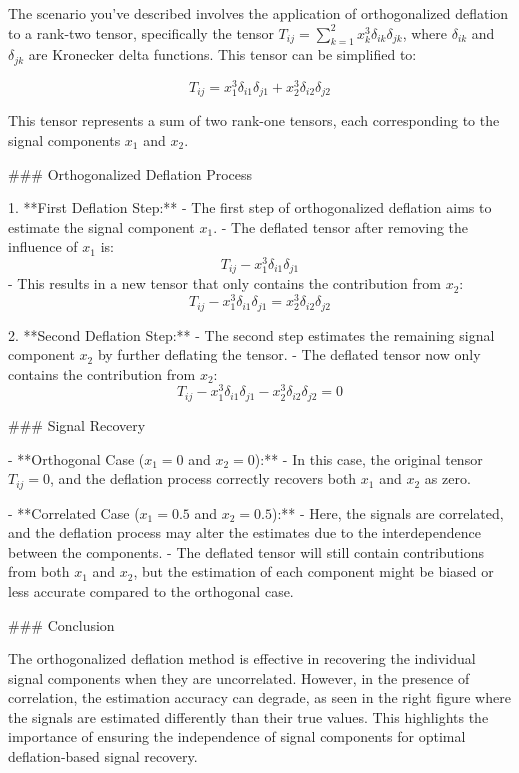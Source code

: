 The scenario you've described involves the application of orthogonalized deflation to a rank-two tensor, specifically the tensor \( T_{ij} = \sum_{k=1}^{2} x_k^3 \delta_{ik} \delta_{jk} \), where \( \delta_{ik} \) and \( \delta_{jk} \) are Kronecker delta functions. This tensor can be simplified to:

\[ T_{ij} = x_1^3 \delta_{i1} \delta_{j1} + x_2^3 \delta_{i2} \delta_{j2} \]

This tensor represents a sum of two rank-one tensors, each corresponding to the signal components \( x_1 \) and \( x_2 \).

### Orthogonalized Deflation Process

1. **First Deflation Step:**
   - The first step of orthogonalized deflation aims to estimate the signal component \( x_1 \).
   - The deflated tensor after removing the influence of \( x_1 \) is:
     \[ T_{ij} - x_1^3 \delta_{i1} \delta_{j1} \]
   - This results in a new tensor that only contains the contribution from \( x_2 \):
     \[ T_{ij} - x_1^3 \delta_{i1} \delta_{j1} = x_2^3 \delta_{i2} \delta_{j2} \]

2. **Second Deflation Step:**
   - The second step estimates the remaining signal component \( x_2 \) by further deflating the tensor.
   - The deflated tensor now only contains the contribution from \( x_2 \):
     \[ T_{ij} - x_1^3 \delta_{i1} \delta_{j1} - x_2^3 \delta_{i2} \delta_{j2} = 0 \]

### Signal Recovery

- **Orthogonal Case (\( x_1 = 0 \) and \( x_2 = 0 \)):**
  - In this case, the original tensor \( T_{ij} = 0 \), and the deflation process correctly recovers both \( x_1 \) and \( x_2 \) as zero.

- **Correlated Case (\( x_1 = 0.5 \) and \( x_2 = 0.5 \)):**
  - Here, the signals are correlated, and the deflation process may alter the estimates due to the interdependence between the components.
  - The deflated tensor will still contain contributions from both \( x_1 \) and \( x_2 \), but the estimation of each component might be biased or less accurate compared to the orthogonal case.

### Conclusion

The orthogonalized deflation method is effective in recovering the individual signal components when they are uncorrelated. However, in the presence of correlation, the estimation accuracy can degrade, as seen in the right figure where the signals are estimated differently than their true values. This highlights the importance of ensuring the independence of signal components for optimal deflation-based signal recovery.